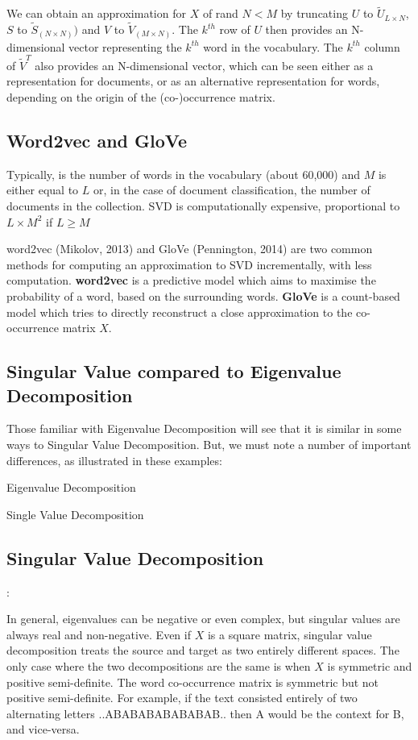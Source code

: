 \documentclass[11pt]{article}
\begin{document}
We can obtain an approximation for $X$ of rand $N < M$ by truncating $U$ to
$\tilde{U}_{L \times N}$, $S$ to $\tilde{S}_{(N \times N)})$ and $V$ to
$\tilde{V}_{(M \times N)}$.
The $k^{th}$ row of $U$ then provides an N-dimensional vector representing the
$k^{th}$ word in the vocabulary.
The $k^{th}$ column of $\tilde{V}^T$ also provides an N-dimensional vector,
which can be seen either as a representation for documents, or as an
alternative representation for words, depending on the origin of the
(co-)occurrence matrix.

\subsection{Word2vec and GloVe}\label{subsec:word2vec-and-glove}
Typically, is the number of words in the vocabulary (about 60,000) and $M$ is
either equal to $L$ or, in the case of document classification, the number of
documents in the collection.
SVD is computationally expensive, proportional to $L \times M^2$ if $L \geq M$

word2vec (Mikolov, 2013) and GloVe (Pennington, 2014) are two common methods for computing an approximation to SVD incrementally, with less computation.
\textbf{word2vec} is a predictive model which aims to maximise the probability of a word, based on the surrounding words.
\textbf{GloVe} is a count-based model which tries to directly reconstruct a close approximation to the co-occurrence matrix $X$.

\subsection{Singular Value compared to Eigenvalue Decomposition}\label{subsec:singular-value-compared-to-eigenvalue-decomposition}
Those familiar with Eigenvalue Decomposition will see that it is similar in some ways to Singular Value Decomposition.
But, we must note a number of important differences, as illustrated in these examples:

Eigenvalue Decomposition
\[\]

Single Value Decomposition
\[\]

\subsection{Singular Value Decomposition}\label{subsec:singular-value-decomposition}:

In general, eigenvalues can be negative or even complex, but singular values are always real and non-negative.
Even if $X$ is a square matrix, singular value decomposition treats the source and target as two entirely different spaces.
The only case where the two decompositions are the same is when $X$ is symmetric and positive semi-definite.
The word co-occurrence matrix is symmetric but not positive semi-definite.
For example, if the text consisted entirely of two alternating letters ..ABABABABABABAB.. then A would be the context for B, and vice-versa.
\end{document}

